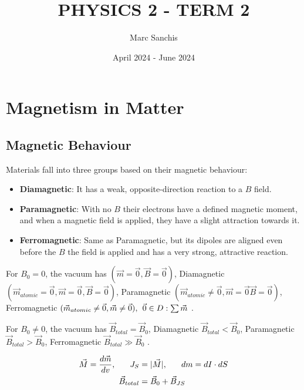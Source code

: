 \documentclass[a4paper]{article}
\title{PHYSICS 2 - TERM 2}
\author{Marc Sanchis}
\date{April 2024 - June 2024}
\begin{document}
\maketitle

\renewcommand{\contentsname}{}
\tableofcontents

\newpage
\restoregeometry
\pagestyle{fancy}
\setcounter{section}{4}

\section{Magnetism in Matter}

\subsection{Magnetic Behaviour}
Materials fall into three groups based on their magnetic behaviour:

\begin{itemize}
    \item \textbf{Diamagnetic}: It has a weak, opposite-direction reaction to a $B$ field.
    \item \textbf{Paramagnetic}: With no $B$ their electrons have a defined magnetic moment, and when a magnetic field is applied, they have a slight attraction towards it.
    \item \textbf{Ferromagnetic}: Same as Paramagnetic, but its dipoles are aligned even before the $B$ the field is applied and has a very strong, attractive reaction.
\end{itemize}

For $B_{0}=0$, the vacuum has $(\vec{m}=\vec{0}, \vec{B}=\vec{0})$, Diamagnetic $(\vec{m}_{atomic}=\vec{0}, \vec{m}=\vec{0},\vec{B}=\vec{0})$, Paramagnetic $(\vec{m}_{atomic}\neq \vec{0},\vec{m}=\vec{0}\vec{B}=\vec{0})$, Ferromagnetic $(\vec{m}_{atomic}\neq\vec{0},\vec{m}\neq\vec{0}),\hspace{1ex}\vec{0}\in D:\sum\vec{m}$ .

For $B_{0}\neq 0$, the vacuum has $\vec{B}_{total}=\vec{B}_{0}$, Diamagnetic $\vec{B}_{total}<\vec{B}_{0}$, Paramagnetic $\vec{B}_{total}>\vec{B}_{0}$, Ferromagnetic $\vec{B}_{total}\gg \vec{B}_{0}$ .

\begin{align}
\vec{M}=\frac{d\vec{m}}{dv},\hspace{4ex}J_{S}&=|\vec{M}|,\hspace{4ex}dm=dI\cdot dS \\
\vec{B}_{total}&=\vec{B}_{0}+\vec{B}_{JS}
\end{align}
\end{document}

